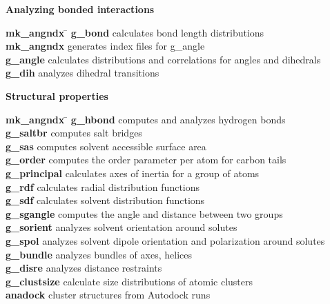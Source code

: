 \begin{description}
\item {\large\bf Analyzing bonded interactions}
\vspace{-2ex}\begin{tabbing}
{\bf mk\_angndx} \= \kill
{\bf g\_bond} \> calculates bond length distributions \\
{\bf mk\_angndx} \> generates index files for g\_angle \\
{\bf g\_angle} \> calculates distributions and correlations for angles and dihedrals \\
{\bf g\_dih} \> analyzes dihedral transitions \\
\end{tabbing}\vspace{-2ex}

\item {\large\bf Structural properties}
\vspace{-2ex}\begin{tabbing}
{\bf mk\_angndx} \= \kill
{\bf g\_hbond} \> computes and analyzes hydrogen bonds \\
{\bf g\_saltbr} \> computes salt bridges \\
{\bf g\_sas} \> computes solvent accessible surface area \\
{\bf g\_order} \> computes the order parameter per atom for carbon tails \\
{\bf g\_principal} \> calculates axes of inertia for a group of atoms \\
{\bf g\_rdf} \> calculates radial distribution functions \\
{\bf g\_sdf} \> calculates solvent distribution functions \\
{\bf g\_sgangle} \> computes the angle and distance between two groups \\
{\bf g\_sorient} \> analyzes solvent orientation around solutes \\
{\bf g\_spol} \> analyzes solvent dipole orientation and polarization around solutes \\
{\bf g\_bundle} \> analyzes bundles of axes, {\eg} helices \\
{\bf g\_disre} \> analyzes distance restraints \\
{\bf g\_clustsize} \> calculate size distributions of atomic clusters \\
{\bf anadock} \> cluster structures from Autodock runs \\
\end{tabbing}\vspace{-2ex}


\end{description}
